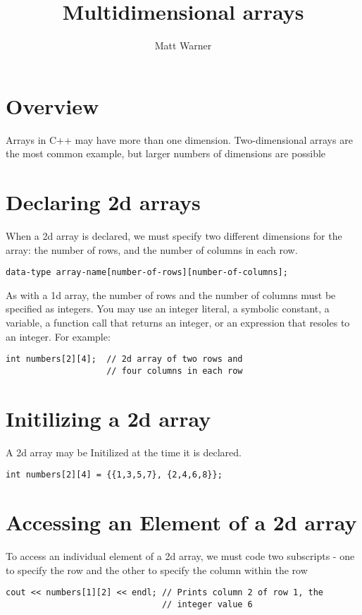 \documentclass{report}
\title{\Huge{Multidimensional arrays}}
\author{\huge{Matt Warner}}
\date{\huge{}}
\begin{document}
  \maketitle
  \tableofcontents
  \newpage
  \section{Overview}
  Arrays in C++ may have more than one dimension. Two-dimensional arrays are the most common example, but larger numbers of dimensions are possible
  \section{Declaring 2d arrays}
  When a 2d array is declared, we must specify two different dimensions for the array: the number of rows, and the number of columns in each row.
\begin{verbatim}
data-type array-name[number-of-rows][number-of-columns];
\end{verbatim}
\bigbreak \noindent
As with a 1d array, the number of rows and the number of columns must be specified as integers. You may use an integer literal, a symbolic constant, a variable, a function call that returns an integer, or an expression that resoles to an integer. For example:
\begin{mdframed}
\begin{verbatim}
int numbers[2][4];  // 2d array of two rows and
                    // four columns in each row
\end{verbatim}
\end{mdframed}
\section{Initilizing a 2d array}
A 2d array may be Initilized at the time it is declared.
\begin{mdframed}
\begin{verbatim}
int numbers[2][4] = {{1,3,5,7}, {2,4,6,8}};
\end{verbatim}
\end{mdframed}
\section{Accessing an Element of a 2d array}
To access an individual element of a 2d array, we must code two subscripts - one to specify the row and the other to specify the column within the row
\begin{mdframed}
\begin{verbatim}
cout << numbers[1][2] << endl; // Prints column 2 of row 1, the
                               // integer value 6
\end{verbatim}
\end{mdframed} 
\end{document}
